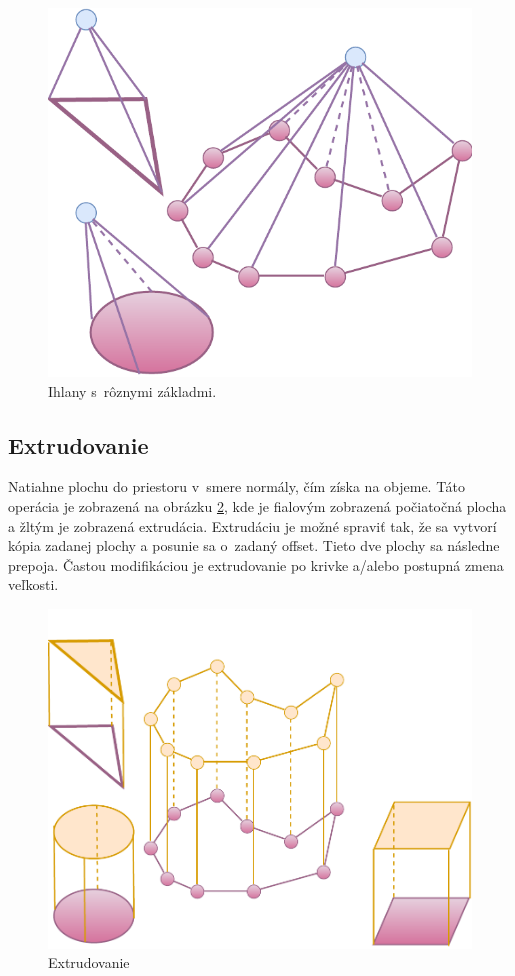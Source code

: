 

\begin{figure}[H]
	\centering
	\includegraphics[height=0.3\textwidth]{obrazky-figures/Diagram/Draw/4Object/DP Navrh operacii-3D - ObjectsCreate Pyramid.pdf}
	\caption{Ihlany s~rôznymi základmi.}
	\label{fig:ObjectsCreate Pyramid}
\end{figure}


\subsection*{Extrudovanie} 
Natiahne plochu do priestoru v~smere normály, čím získa na objeme. Táto operácia je zobrazená na obrázku \ref{fig:ObjectsExtrude}, kde je fialovým zobrazená počiatočná plocha a žltým je zobrazená extrudácia. Extrudáciu je možné spraviť tak, že sa vytvorí kópia zadanej plochy a posunie sa o~zadaný offset. Tieto dve plochy sa následne prepoja. Častou modifikáciou je extrudovanie po krivke a/alebo postupná zmena veľkosti.


\begin{figure}[H]
	\centering
	\includegraphics[height=0.3\textwidth]{obrazky-figures/Diagram/Draw/4Object/DP Navrh operacii-3D - ObjectsExtrude.pdf}
	\caption{Extrudovanie}
	\label{fig:ObjectsExtrude}
\end{figure}


